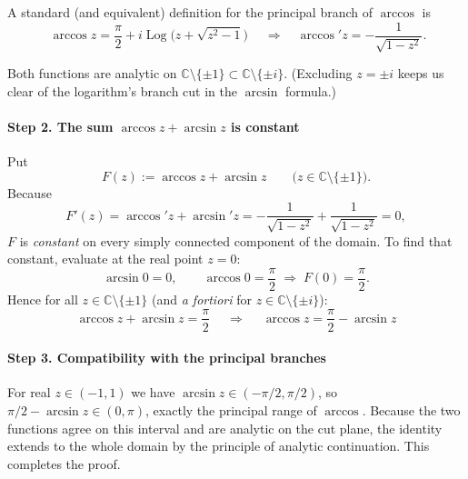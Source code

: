\documentclass[12pt]{article}
\DeclareMathOperator{\Log}{Log}
\theoremstyle{definition} %
\theoremstyle{plain} %
\begin{document}
A standard (and equivalent) definition for the principal branch of
\(\arccos\) is
\[
\boxed{\;
\arccos z
 =\frac{\pi}{2}+i\Log\!\bigl( z+\sqrt{z^{2}-1}\bigr)
\;}
\quad\Longrightarrow\quad
\arccos' z
   =-\frac{1}{\sqrt{1-z^{2}}}.
\]

Both functions are analytic on
\(\mathbb{C}\setminus\{\pm1\}\subset\mathbb{C}\setminus\{\pm i\}\).
(Excluding \(z=\pm i\) keeps us clear of the logarithm’s branch cut in
the \(\arcsin\) formula.)

\paragraph{Step 2.  The sum \(\arccos z+\arcsin z\) is constant}

Put
\[
F(z):=\arccos z+\arcsin z
      \qquad\bigl(z\in\mathbb{C}\setminus\{\pm1\}\bigr).
\]
Because
\[
F'(z)
   =\arccos' z+\arcsin' z
   =-\frac{1}{\sqrt{1-z^{2}}}
    +\frac{1}{\sqrt{1-z^{2}}}=0,
\]
\(F\) is \emph{constant} on every simply connected component of the
domain.  To find that constant, evaluate at the real point \(z=0\):
\[
\arcsin 0 = 0,
\qquad
\arccos 0 = \frac{\pi}{2}
\;\Longrightarrow\;
F(0)=\frac{\pi}{2}.
\]
Hence for all
\(z\in\mathbb{C}\setminus\{\pm1\}\) (and \emph{a fortiori} for
\(z\in\mathbb{C}\setminus\{\pm i\}\)):
\[
\boxed{\;
\arccos z+\arcsin z=\frac{\pi}{2}
\;}
\quad\Longrightarrow\quad
\boxed{\;
\arccos z=\frac{\pi}{2}-\arcsin z
\;}
\]

\paragraph{Step 3.  Compatibility with the principal branches}

For real \(z\in(-1,1)\) we have \( \arcsin z\in(-\pi/2,\pi/2)\), so
\(\pi/2-\arcsin z\in(0,\pi)\), exactly the principal range of
\(\arccos\).  Because the two functions agree on this interval and are
analytic on the cut plane, the identity extends to the whole domain
by the principle of analytic continuation.  This completes the proof.
\end{document}
